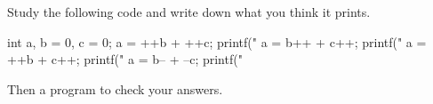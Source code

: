 Study the following code and write down what you think it prints.
\begin{codesnippet}
int a, b = 0, c = 0;
a = ++b + ++c;
printf("%
a = b++ + c++;
printf("%
a = ++b + c++;
printf("%
a = b-- + --c;
printf("%
\end{codesnippet}
\begin{exercise}
Then a program to check your answers.
\end{exercise}
